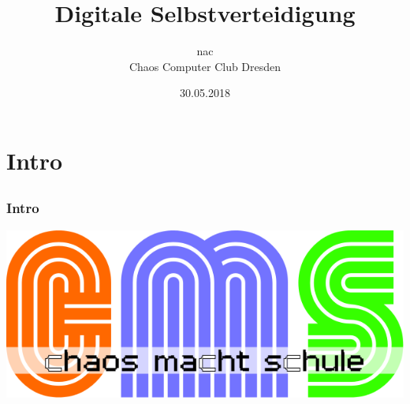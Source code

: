 \documentclass[12pt, table]{beamer}
\title{Digitale Selbstverteidigung}
\author{\small nac\\\large Chaos Computer Club Dresden}
\date{30.05.2018}
\begin{document}
\section{Intro}
\subsection{}

\begin{frame}
	\frametitle{Intro}
	\begin{center}
		\includegraphics[height=0.5\textheight]{../img/cms-text.png}
	\end{center}
\end{frame}
\end{document}
